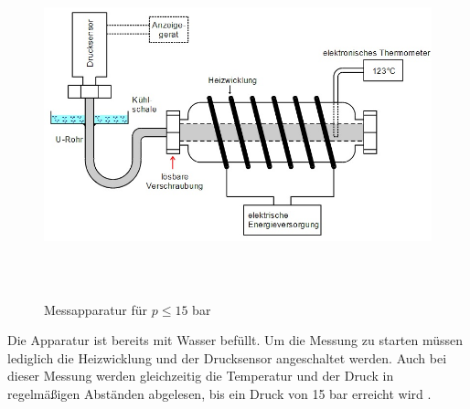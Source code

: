 \begin{figure}
  \centering
  \includegraphics[height=10cm]{Aufbau2.jpg}
  \caption{Messapparatur für $p ≤ 15$ bar \cite{TU}}
  \label{fig:aufbau2}
\end{figure}

Die Apparatur ist bereits mit Wasser befüllt. Um die Messung zu starten müssen
lediglich die Heizwicklung und der Drucksensor angeschaltet werden. Auch bei
dieser Messung werden gleichzeitig die Temperatur und der Druck in regelmäßigen
Abständen abgelesen, bis ein Druck von 15 bar erreicht wird \cite{TU}.
